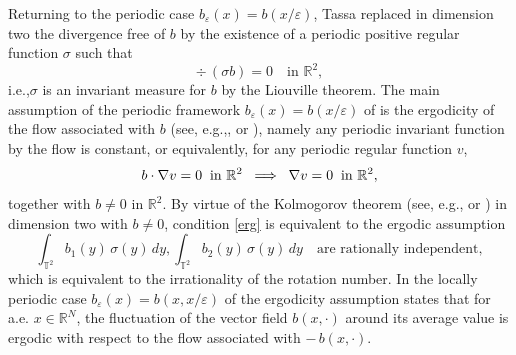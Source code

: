 \documentclass[11pt]{article}
\newcommand{\ie}{i.e.,\xspace}
\newcommand{\eg}{e.g.,\xspace}
\newcommand\implique{\mathchoice{\implies}{\Rightarrow}{\Rightarrow}{\Rightarrow}}
\def \RR {\mathbb R}
\def \TT {\mathbb T}
\theoremstyle{plain}
\theoremstyle{definition}
\numberwithin{equation}{section}
\begin{document}
Returning to the periodic case $b_\varepsilon(x)=b(x/\varepsilon)$, Tassa \cite{Tas} replaced in dimension two the divergence free of $b$ by the existence of a periodic positive regular function $\sigma$ such that
\begin{equation}\label{divb}
\div\,(\sigma b)=0\quad\mbox{in }\RR^2,
\end{equation}
\ie $\sigma$ is an invariant measure for $b$ by the Liouville theorem.
The main assumption of the periodic framework $b_\varepsilon(x)=b(x/\varepsilon)$ of \cite{Bre,HoXi,Tas} is the ergodicity of the flow associated with $b$ (see, \eg \cite[Lect.\,1]{Sin}, or \cite[Chap.\,II, \S\,5]{ReSi}), namely any periodic invariant function by the flow is constant, or equivalently, for any periodic regular function $v$,
\begin{equation}\label{erg}
b\cdot\nabla v=0\;\;\mbox{in }\RR^2\;\implique\;\nabla v=0\;\;\mbox{in }\RR^2,
\end{equation}
together with $b\neq 0$ in $\RR^2$. By virtue of the Kolmogorov theorem (see, \eg \cite[Lect.\,11]{Sin} or \cite[\S 2]{Tas}) in dimension two with $b\neq 0$, condition \eqref{erg} is equivalent to the ergodic assumption
\begin{equation}\label{birr}
\int_{\TT^2}b_1(y)\,\sigma(y)\,dy,\int_{\TT^2}b_2(y)\,\sigma(y)\,dy\quad\mbox{are rationally independent},
\end{equation}
which is equivalent to the irrationality of the rotation number.
In the locally periodic case $b_\varepsilon(x)=b(x,x/\varepsilon)$ of \cite[\S 8]{Gol1} the ergodicity assumption states that for a.e. $x\in\RR^N$, the fluctuation of the vector field $b(x,\cdot)$ around its average value is ergodic with respect to the flow associated with $-\,b(x,\cdot)$.
\end{document}
